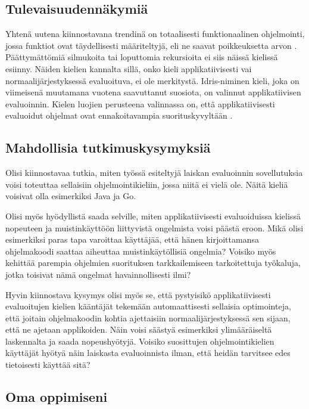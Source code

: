 \subsection{Tulevaisuudennäkymiä}

Yhtenä uutena kiinnostavana trendinä on totaalisesti funktionaalinen ohjelmointi, jossa funktiot ovat täydellisesti määriteltyjä, eli ne saavat poikkeuksetta arvon \citep{turner2004total}. Päättymättömiä silmukoita tai loputtomia rekursioita ei siis näissä kielissä esiinny. Näiden kielien kannalta sillä, onko kieli applikatiivisesti vai normaalijärjestyksessä evaluoituva, ei ole merkitystä. Idris-niminen kieli, joka on viimeisenä muutamana vuotena saavuttanut suosiota, on valinnut applikatiivisen evaluoinnin. Kielen luojien perusteena valinnassa on, että applikatiivisesti evaluoidut ohjelmat ovat ennakoitavampia suorituskyvyltään \citep{idrisfaqwhynotlazy}.

\subsection{Mahdollisia tutkimuskysymyksiä}
Olisi kiinnostavaa tutkia, miten työssä esiteltyjä laiskan evaluoinnin sovellutuksia voisi toteuttaa sellaisiin ohjelmointikieliin, jossa niitä ei vielä ole. Näitä kieliä voisivat olla esimerkiksi Java ja Go.

Olisi myös hyödyllistä saada selville, miten applikatiivisesti evaluoiduissa kielissä nopeuteen ja muistinkäyttöön liittyvistä ongelmista voisi päästä eroon. Mikä olisi esimerkiksi paras tapa varoittaa käyttäjää, että hänen kirjoittamansa ohjelmakoodi saattaa aiheuttaa muistinkäytöllisiä ongelmia? Voisiko myös kehittää parempia ohjelmien suorituksen tarkkailemiseen tarkoitettuja työkaluja, jotka toisivat nämä ongelmat havainnollisesti ilmi?

Hyvin kiinnostava kysymys olisi myös se, että pystyisikö applikatiivisesti evaluoitujen kielien kääntäjät tekemään automaattisesti sellaisia optimointeja, että joitain ohjelmakoodin kohtia ajettaisiin normaalijärjestyksessä sen sijaan, että ne ajetaan applikoiden. Näin voisi säästyä esimerkiksi ylimääräiseltä laskennalta ja saada nopeushyötyjä. Voisiko suosittujen ohjelmointikielien käyttäjät hyötyä näin laiskasta evaluoinnista ilman, että heidän tarvitsee edes tietoisesti käyttää sitä?

\subsection{Oma oppimiseni}


